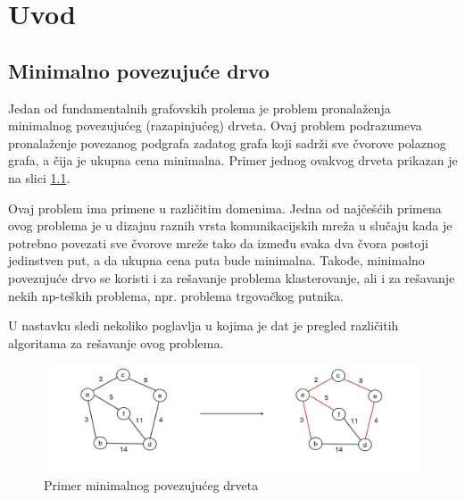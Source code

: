 \documentclass[12pt,oneside]{memoir}
\begin{document}
\frontmatter
\naslovna
\komisija
\apstrakt
\tableofcontents*

\mainmatter

\chapter{Uvod}
\pangrami

\section{Minimalno povezujuće drvo}
Jedan od fundamentalnih grafovskih prolema je problem pronalaženja minimalnog povezujućeg (razapinjućeg) drveta. Ovaj problem podrazumeva pronalaženje povezanog podgrafa zadatog grafa koji sadrži sve čvorove polaznog grafa, a čija je ukupna cena minimalna. Primer jednog ovakvog drveta prikazan je na slici \ref{fig:MST}.

Ovaj problem ima primene u različitim domenima. Jedna od najčešćih primena ovog problema je u dizajnu raznih vrsta komunikacijskih mreža u slučaju kada je potrebno povezati sve čvorove mreže tako da između svaka dva čvora postoji jedinstven put, a da ukupna cena puta bude minimalna. Takođe, minimalno povezujuće drvo se koristi i za rešavanje problema klasterovanje, ali i za rešavanje nekih np-teških problema, npr. problema trgovačkog putnika.

U nastavku sledi nekoliko poglavlja u kojima je dat je pregled različitih algoritama za rešavanje ovog problema.

\begin{figure}[!ht]
  \centering
  \label{fig:MST}
  \includegraphics[width=1.0\textwidth]{matfmaster/MST.png}
  \caption{Primer minimalnog povezujućeg drveta}
\end{figure}
\end{document}
